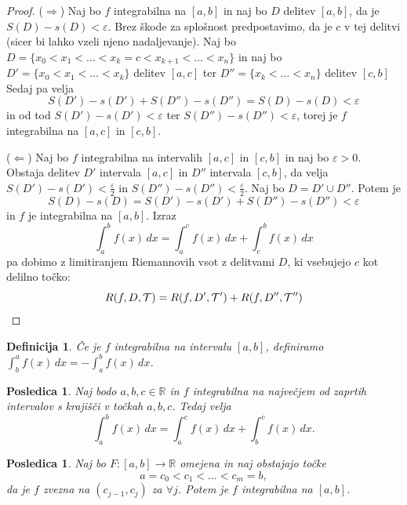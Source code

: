 \documentclass[10pt, a4paper]{article}
\newtheorem{posledica}[izr]{Posledica}
\newtheorem{defi}[izr]{Definicija}
\newenvironment{noticeB}{%
  \tcolorbox[%
  notitle,
  empty,
  enhanced,  %
  breakable,
  coltext=black,
  colback=white, 
  fontupper=\rmfamily,
  noparskip,
  sharp corners,
  boxrule=-1pt,  %
  frame hidden,
  left=7pt,  %
  right=7pt,
  top=5pt,
  bottom=5pt,
  before skip=2.5ex plus 2pt,
  after skip=2.5ex plus 2pt,
  borderline west = {1.5pt}{-0.1pt}{blue!30!black}, %
  overlay unbroken and last={%
    \draw[color=black, line width=1.25pt]
    ($(frame.south west)+(1.pt, -0.1pt)$) -- ++(2em, 0);
  }
  ]}
{\endtcolorbox}
\newenvironment{definicija}{\begin{noticeB}\begin{defi}}{%
\end{defi}\end{noticeB}}
\newenvironment{noticeC}{%
  \tcolorbox[%
  notitle,
  empty,
  enhanced,  %
  breakable,
  coltext=black, 
  fontupper=\rmfamily,
  noparskip,
  sharp corners,
  boxrule=-1pt,  %
  frame hidden,
  left=7pt,  %
  right=7pt,
  top=5pt,
  bottom=5pt,
  before skip=2.5ex plus 2pt,
  after skip=2.5ex plus 2pt,
  overlay unbroken and last={%
  },
  ]}
{\endtcolorbox}
\newenvironment{dokaz}%
  {\begin{noticeC}\begin{proof}}%
  {\end{proof}\end{noticeC}}
\newcommand{\R}{\mathbb {R}}
\begin{document}
\begin{dokaz}
    ($\Rightarrow$) Naj bo $f$ integrabilna na $[a, b]$ in naj bo $D$ delitev $[a, b]$, da je $S(D) - s(D) < \varepsilon$.
    Brez škode za  splošnost predpostavimo, da je $c$ v tej delitvi (sicer bi lahko vzeli njeno nadaljevanje).
    Naj bo $D = \{x_0 < x_1 < \dots < x_k = c < x_{k+1} < \dots < x_n\}$ in naj bo
    $D' = \{x_0 < x_1 < \dots < x_k\}$ delitev $[a, c]$ ter $D'' = \{x_k < \dots < x_n\}$ delitev $[c, b]$
    Sedaj pa velja $$S(D') - s(D') + S(D'') - s(D'') = S(D) - s(D) < \varepsilon$$ in od tod $S(D') - s(D') < \varepsilon$ ter $S(D'') - s(D'') < \varepsilon$,
    torej je $f$ integrabilna na $[a, c]$ in $[c, b]$.

    ($\Leftarrow$) Naj bo $f$ integrabilna na intervalih $[a, c]$ in $[c, b]$ in
    naj bo $\varepsilon > 0$. Obstaja delitev $D'$ intervala $[a, c]$ in $D''$ intervala $[c, b]$, da velja 
    $S(D') - s(D') < \frac{\varepsilon}{2}$ in $S(D'') - s(D'') < \frac{\varepsilon}{2}$.
    Naj bo $D = D' \cup D''$. Potem je $$S(D) - s(D) = S(D') - s(D') + S(D'') - s(D'') < \varepsilon$$
    in $f$ je integrabilna na $[a, b]$. Izraz $$\int_a ^b f(x)\,dx = \int_a ^c f(x)\,dx + \int_c ^b f(x)\,dx$$ pa dobimo z limitiranjem Riemannovih vsot z delitvami $D$, ki vsebujejo $c$ kot delilno točko:
    \begin{equation*}
        R(f, D, \mathcal{T}) = R(f, D', \mathcal{T}') + R(f, D'', \mathcal{T}'') \qedhere
    \end{equation*}
\end{dokaz}

\begin{definicija}
    Če je $f$ integrabilna na intervalu $[a, b]$, definiramo $\int_b ^a f(x)\,dx = - \int_a ^b f(x)\,dx$.
\end{definicija}

\begin{posledica}
    Naj bodo $a,b,c \in \R$ in $f$ integrabilna na največjem od zaprtih intervalov s krajišči v točkah $a, b, c$.
    Tedaj velja $$\int_a ^b f(x)\,dx = \int_a ^c f(x)\,dx + \int_b ^c f(x)\,dx.$$
\end{posledica}

\begin{posledica}
    Naj bo $F : [a, b] \rightarrow \R$ omejena in naj obstajajo točke $$a = c_0 < c_1 < \dots < c_m = b,$$ da je $f$ zvezna na $(c_{j-1}, c_j)$ za $\forall j$.
    Potem je $f$ integrabilna na $[a, b]$.
\end{posledica}
\end{document}
